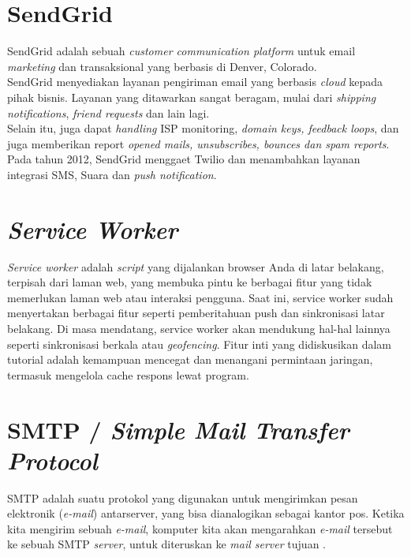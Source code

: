 	\section{  SendGrid}
	SendGrid adalah sebuah \textit{customer communication platform} untuk email \textit{marketing} dan transaksional yang berbasis di Denver, Colorado.
	\\ \indent
	SendGrid menyediakan layanan pengiriman email yang berbasis \textit{cloud} kepada pihak bisnis. Layanan yang ditawarkan sangat beragam, mulai dari \textit{shipping notifications}, \textit{friend requests} dan lain lagi. \\ \indent
	Selain itu, juga dapat \textit{handling} ISP monitoring, \textit{domain keys, feedback loops}, dan juga memberikan report \textit{opened mails, unsubscribes, bounces dan spam reports}. Pada tahun 2012, SendGrid menggaet Twilio dan menambahkan layanan integrasi SMS, Suara dan \textit{push notification}. \cite{wikipedia_sendgrid_2017}
	
	\section{  \textit{Service Worker}}
	\textit{Service worker }adalah \textit{script} yang dijalankan browser Anda di latar belakang, terpisah dari laman web, yang membuka pintu ke berbagai fitur yang tidak memerlukan laman web atau interaksi pengguna. Saat ini, service worker sudah menyertakan berbagai fitur seperti pemberitahuan push dan sinkronisasi latar belakang. Di masa mendatang, service worker akan mendukung hal-hal lainnya seperti sinkronisasi berkala atau \textit{geofencing}. Fitur inti yang didiskusikan dalam tutorial adalah kemampuan mencegat dan menangani permintaan jaringan, termasuk mengelola cache respons lewat program\cite{google_developers_service_2017}.
	
	\section{  SMTP / \textit{Simple Mail Transfer Protocol}}
	SMTP adalah suatu protokol yang digunakan untuk mengirimkan pesan elektronik (\textit{e-mail}) antarserver, yang bisa dianalogikan sebagai kantor pos. Ketika kita mengirim sebuah \textit{e-mail}, komputer kita akan mengarahkan \textit{e-mail} tersebut ke sebuah SMTP \textit{server}, untuk diteruskan ke \textit{mail server} tujuan \cite{noauthor_smtp_nodate}. 
	
